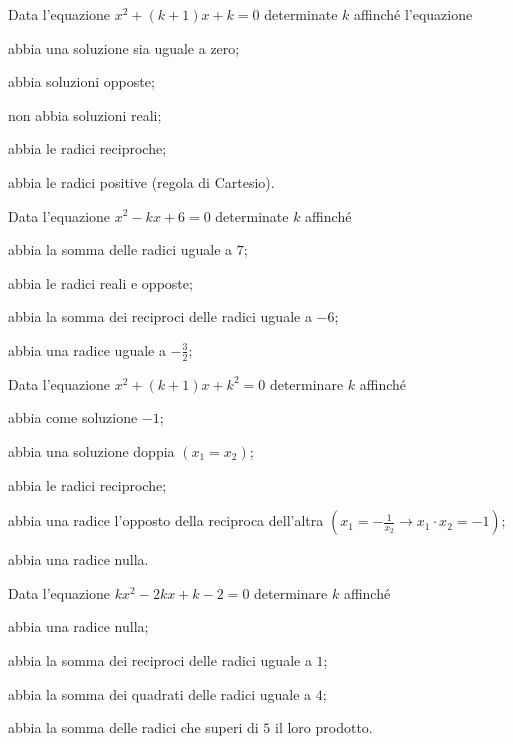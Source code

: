 \begin{esercizio}[\Ast]
 \label{ese:3.99}
Data l'equazione $x^{2} + (k + 1) x + k = 0$ determinate $k$ affinché l'equazione
\begin{enumeratea}
\item abbia una soluzione sia uguale a zero;
\item abbia soluzioni opposte;
\item non abbia soluzioni reali;
\item abbia le radici reciproche;
\item abbia le radici positive (regola di Cartesio).
\end{enumeratea}
\end{esercizio}

\begin{esercizio}[\Ast]
 \label{ese:3.100}
Data l'equazione $x^{2}-kx + 6 = 0$ determinate $k$ affinché
\begin{enumeratea}
\item abbia la somma delle radici uguale a $7$;
\item abbia le radici reali e opposte;
\item abbia la somma dei reciproci delle radici uguale a $-6$;
\item abbia una radice uguale a $- \frac{3}{2}$;
\end{enumeratea}
\end{esercizio}

\begin{esercizio}[\Ast]
 \label{ese:3.101}
Data l'equazione $x^{2} + (k + 1) x + k^{2} = 0$ determinare $k$ affinché
\begin{enumeratea}
\item abbia come soluzione $-1$;
\item abbia una soluzione doppia $(x_1 =x_2)$;
\item abbia le radici reciproche;
\item abbia una radice l'opposto della reciproca dell'altra $\left(x_1=-\frac{1}{x_2}\rightarrow x_1 \cdot x_2=-1\right)$;
\item abbia una radice nulla.
\end{enumeratea}
\end{esercizio}

\begin{esercizio}[\Ast]
 \label{ese:3.102}
Data l'equazione $kx^{2}-2kx + k-2 = 0$ determinare $k$ affinché
\begin{enumeratea}
\item abbia una radice nulla;
\item abbia la somma dei reciproci delle radici uguale a $1$;
\item abbia la somma dei quadrati delle radici uguale a $4$;
\item abbia la somma delle radici che superi di $5$ il loro prodotto.
\end{enumeratea}
\end{esercizio}

